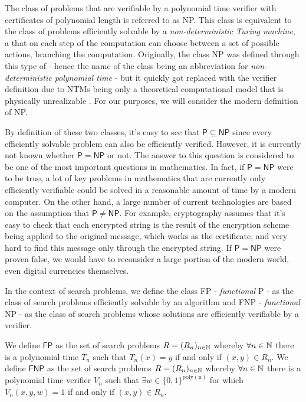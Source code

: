 The class of problems that are verifiable by a polynomial time verifier with certificates of polynomial length is referred to as \textsf{NP}. This class is equivalent to the class of problems efficiently solvable by a \textit{non-deterministic Turing machine}, a \TM that on each step of the computation can choose between a set of possible actions, branching the computation. Originally, the class \textsf{NP} was defined through this type of \TM \@ - hence the name of the class being an abbreviation for \textit{non-deterministic polynomial time} - but it quickly got replaced with the verifier definition due to \textsf{NTM}s being only a theoretical computational model that is physically unrealizable \cite{complexity_arora_barak}. For our purposes, we will consider the modern definition of \textsf{NP}.

By definition of these two classes, it's easy to see that $\mathsf{P} \subseteq \mathsf{NP}$ since every efficiently solvable problem can also be efficiently verified. However, it is currently not known whether $\mathsf{P} = \mathsf{NP}$ or not. The answer to this question is considered to be one of the most important questions in mathematics. In fact, if $\mathsf{P} = \mathsf{NP}$ were to be true, a lot of key problems in mathematics that are currently only efficiently verifiable could be solved in a reasonable amount of time by a modern computer. On the other hand, a large number of current technologies are based on the assumption that $\mathsf{P} \neq \mathsf{NP}$. For example, cryptography assumes that it's easy to check that each encrypted string is the result of the encryption scheme being applied to the original message, which works as the certificate, and very hard to find this message only through the encrypted string. If $\mathsf{P} = \mathsf{NP}$ were proven false, we would have to reconsider a large portion of the modern world, even digital currencies themselves.

In the context of search problems, we define the class \textsf{FP} - \textit{functional} \textsf{P} - as the class of search problems efficiently solvable by an algorithm and \textsf{FNP} - \textit{functional} \textsf{NP} - as the class of search problems whose solutions are efficiently verifiable by a verifier. 

\newpage

\begin{definition}
 We define $\mathsf{FP}$ as the set of search problems $R = (R_n)_{n \in \mathbb{N}}$ whereby $\forall n \in \mathbb{N}$ there is a polynomial time \TM $T_n$ such that $T_n(x) = y$ if and only if $(x,y) \in R_n$. We define $\mathsf{FNP}$ as the set of search problems $R = (R_n)_{n \in \mathbb{N}}$ whereby $\forall n \in \mathbb{N}$ there is a polynomial time verifier $V_n$ such that $\exists w \in \{0,1\}^{\mathrm{poly(n)}}$ for which $V_n(x,y,w) = 1$ if and only if $(x,y) \in R_n$. 
\end{definition}

